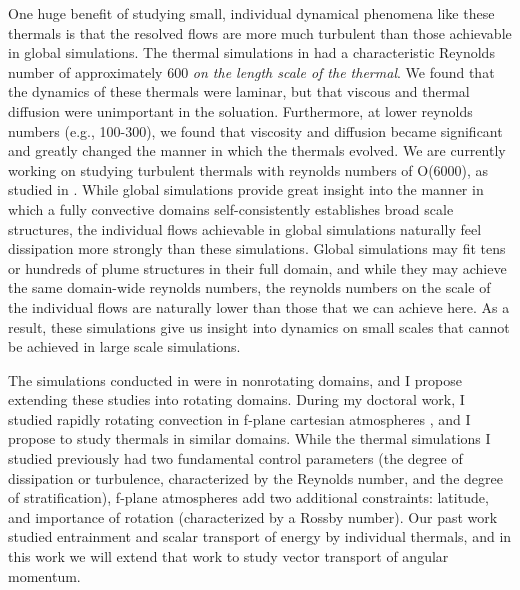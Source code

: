 \documentclass[aasms,12pt]{article}
\begin{document}
One huge benefit of studying small, individual dynamical phenomena like these thermals is that the resolved flows are more much turbulent than those achievable in global simulations.
The thermal simulations in \citet{andersLB2019} had a characteristic Reynolds number of approximately 600 \emph{on the length scale of the thermal}.
We found that the dynamics of these thermals were laminar, but that viscous and thermal diffusion were unimportant in the soluation.
Furthermore, at lower reynolds numbers (e.g., 100-300), we found that viscosity and diffusion became significant and greatly changed the manner in which the thermals evolved.
We are currently working on studying turbulent thermals with reynolds numbers of O(6000), as studied in \citet{lecoanet&jeevanjee2019}.
While global simulations provide great insight into the manner in which a fully convective domains self-consistently establishes broad scale structures, the individual flows achievable in global simulations naturally feel dissipation more strongly than these simulations. 
Global simulations may fit tens or hundreds of plume structures in their full domain, and while they may achieve the same domain-wide reynolds numbers, the reynolds numbers on the scale of the individual flows are naturally lower than those that we can achieve here.
As a result, these simulations give us insight into dynamics on small scales that cannot be achieved in large scale simulations.

The simulations conducted in \citet{andersLB2019} were in nonrotating domains, and I propose extending these studies into rotating domains.
During my doctoral work, I studied rapidly rotating convection in f-plane cartesian atmospheres \citep{anders&all2019}, and I propose to study thermals in similar domains.
While the thermal simulations I studied previously had two fundamental control parameters (the degree of dissipation or turbulence, characterized by the Reynolds number, and the degree of stratification), f-plane atmospheres add two additional constraints: latitude, and importance of rotation (characterized by a Rossby number).
Our past work studied entrainment and scalar transport of energy by individual thermals, and in this work we will extend that work to study vector transport of angular momentum.
\end{document}
